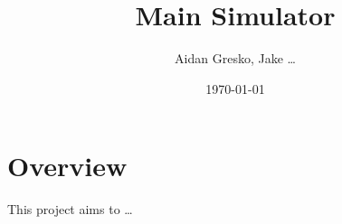 \documentclass{article}
\author{Aidan Gresko, Jake \dots}
\title{Main Simulator}
\date{\today}
\begin{document}
	\maketitle
	
	\section{Overview}
	This project aims to \dots
\end{document}
